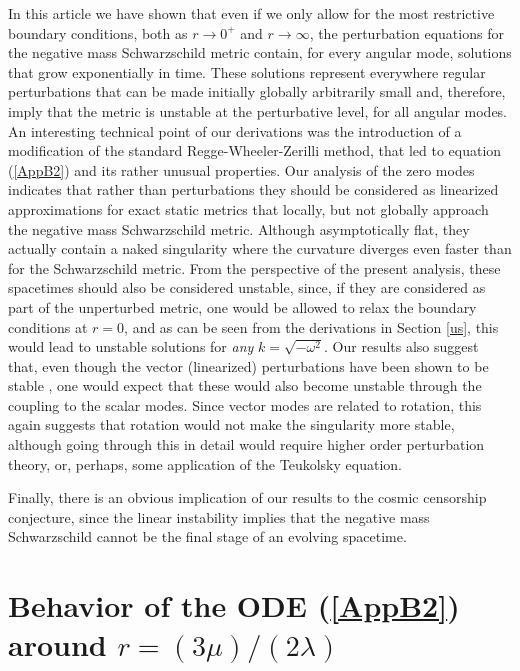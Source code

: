 \documentclass[12pt,aps,floats,showpacs,amssymb,tightenlines]{revtex4}
\newcommand{\s}{ Schwarzschild }
\begin{document}
In this article we have shown that even if we only allow for the
 most restrictive boundary conditions, both as $r \to 0^+ $ and $r \to \infty$, the
 perturbation equations for the negative mass Schwarzschild metric contain,
 for every angular mode, solutions that grow exponentially in time.
 These solutions represent everywhere regular perturbations that can be
 made initially globally arbitrarily small and, therefore, imply that
 the metric is unstable at the perturbative level, for all angular modes.
 An interesting technical point of our derivations was the introduction of
a modification of the standard Regge-Wheeler-Zerilli method, that led to equation
 (\ref{AppB2}) and its rather unusual properties.
Our analysis of the zero modes indicates that rather than
perturbations they should be considered as linearized approximations
for exact static metrics that locally, but not globally approach the
negative mass Schwarzschild metric. Although asymptotically flat,
they actually contain a naked singularity where the curvature
diverges even faster than for the Schwarzschild metric. From the
perspective of the present analysis, these spacetimes should also be considered
unstable, since, if they are considered as part of the unperturbed
metric, one would be allowed to relax the boundary conditions at
$r=0$, and as can be seen from the derivations in Section \ref{us}, this
would lead to unstable solutions for {\em any} $k = \sqrt{-\omega^2} $. Our
results also suggest that, even though the vector (linearized)
perturbations have been shown to be stable \cite{ghi}, one would
expect that these would also become unstable through the coupling to
the scalar modes. Since vector modes are related to rotation, this
again suggests that rotation would not make the singularity more
stable, although going through this in detail would require higher
order perturbation theory, or, perhaps, some application of the
Teukolsky equation.

Finally, there is an obvious implication of our results to the
cosmic censorship conjecture, since the linear instability implies
that the negative mass \s cannot be the final stage of
an evolving spacetime.

\appendix

\section{Behavior of the ODE (\ref{AppB2}) around $r = (3 \mu)/(2 \lambda)$ }
\end{document}
